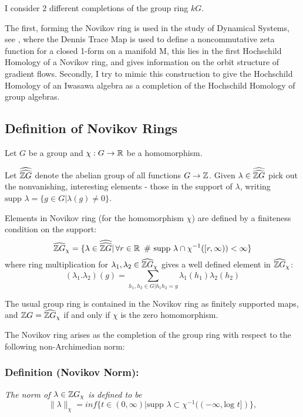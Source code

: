 I consider 2 different completions of the group ring $kG$. 

The first, forming the Novikov ring is used in the study of Dynamical Systems, see \cite{S}, where the Dennis Trace Map is used to define a noncommutative zeta function for a closed 1-form on a manifold M, this lies in the first Hochschild Homology of a Novikov ring, and gives information on the orbit structure of gradient flows. Secondly, I try to mimic this construction to give the Hochschild Homology of an Iwasawa algebra as a completion of the Hochschild Homology of group algebras. 
\subsection{Definition of Novikov Rings}
Let $G$ be a group and $\chi:G\rightarrow \mathbb R$ be a homomorphism. 

Let $\widehat{\widehat{\mathbb Z G}}$  denote the abelian group of all functions $G\rightarrow \mathbb Z$. Given $\lambda\in \widehat{\widehat{\mathbb Z G}}$ pick out the nonvanishing, interesting elements - those in the support of $\lambda$, writing $\text{supp }\lambda = \{g\in G|\lambda(g)\neq 0\}$.

Elements in Novikov ring (for the homomorphism $\chi$) are defined by a finiteness condition on the support:
$$\widehat{\mathbb Z G}_\chi = \{\lambda\in \widehat{\widehat{\mathbb Z G}}|\, \forall r\in \mathbb R\,\,\, \# \text{ supp } \lambda \cap \chi^{-1} ([r,\infty))<\infty\}$$
where ring multiplication for $\lambda_1, \lambda_2\in \widehat{\mathbb Z G}_\chi$ gives a well defined element in $\widehat{\mathbb Z G}_\chi$:
$$(\lambda_1.\lambda_2)(g) = \sum_{h_1,h_2\in G |h_1h_2 = g} \lambda_1(h_1) \lambda_2(h_2)$$

The usual group ring is contained in the Novikov ring as finitely supported maps, and $\mathbb Z G = \widehat{\mathbb Z G}_\chi$ if and only if $\chi$ is the zero homomorphism.

The Novikov ring arises as the completion of the group ring with respect to the following non-Archimedian norm:

\subsubsection{Definition (Novikov Norm):}
\emph{The \textit{norm } of $\lambda\in \mathbb Z G_\chi$ is defined to be
$$\parallel \lambda \parallel_\chi = inf \{t\in (0,\infty)| \text{supp } \lambda\subset  \chi^{-1}((-\infty, \text{log }t])\},$$}

